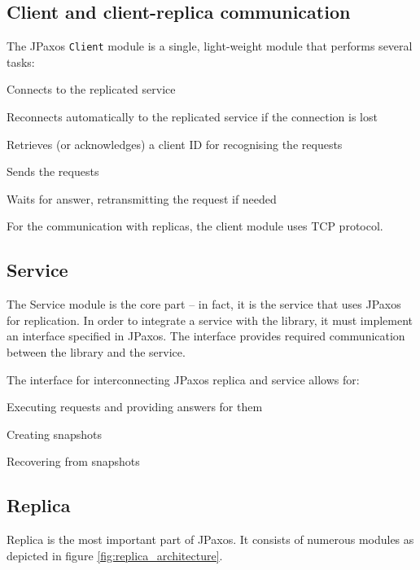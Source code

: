 \subsection{Client and client-replica communication}

The JPaxos \texttt{Client} module is a single, light-weight module that performs several tasks:

\begin{tightList}[\setlength{\topsep}{0pt} \setlength{\partopsep}{0pt}]
 \item[\textbullet] Connects to the replicated service
 \item[\textbullet] Reconnects automatically to the replicated service if the connection is lost
 \item[\textbullet] Retrieves (or acknowledges) a client ID for recognising the requests
 \item[\textbullet] Sends the requests
 \item[\textbullet] Waits for answer, retransmitting the request if needed
\end{tightList}

\noindent For the communication with replicas, the client module uses TCP protocol.

\subsection{Service}

The Service module is the core part -- in fact, it is the service that uses JPaxos for replication.
In order to integrate a service with the library, it must implement an interface specified in JPaxos. The interface provides required communication between the library and the service.

The interface for interconnecting JPaxos replica and service allows for:
\begin{tightList}
 \item[\textbullet] Executing requests and providing answers for them
 \item[\textbullet] Creating snapshots
 \item[\textbullet] Recovering from snapshots
\end{tightList}

\subsection{Replica}

Replica is the most important part of JPaxos. It consists of numerous modules as depicted in figure \ref{fig:replica_architecture}.

